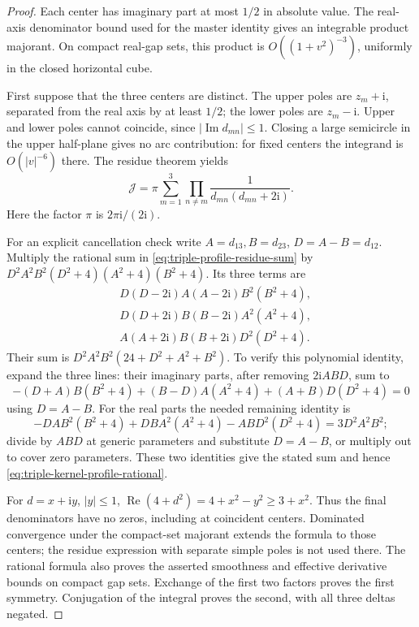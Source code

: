\documentclass[11pt]{article}
\newcommand{\ii}{\mathrm i}
\begin{document}
\begin{proof}
Each center has imaginary part at most \(1/2\) in absolute value.
The real-axis denominator bound used for the master identity gives an
integrable product majorant. On compact real-gap sets, this product is
\(O((1+v^2)^{-3})\), uniformly in the closed horizontal cube.

First suppose that the three centers are distinct. The upper poles
are \(z_m+\ii\), separated from the real axis by at least \(1/2\);
the lower poles are \(z_m-\ii\). Upper and lower poles cannot coincide,
since \(|\operatorname{Im}d_{mn}|\leq1\). Closing a large semicircle
in the upper half-plane gives no arc contribution: for fixed centers
the integrand is \(O(|v|^{-6})\) there. The residue theorem yields
\begin{equation}\label{eq:triple-profile-residue-sum}
 \mathcal J=\pi\sum_{m=1}^3
      \prod_{n\ne m}\frac1{d_{mn}(d_{mn}+2\ii)}.
\end{equation}
Here the factor \(\pi\) is \(2\pi\ii/(2\ii)\).

For an explicit cancellation check write \(A=d_{13},B=d_{23}\),
\(D=A-B=d_{12}\). Multiply the rational sum in
\eqref{eq:triple-profile-residue-sum} by
\(D^2A^2B^2(D^2+4)(A^2+4)(B^2+4)\). Its three terms are
\begin{align*}
 &D(D-2\ii)A(A-2\ii)B^2(B^2+4),\\
 &D(D+2\ii)B(B-2\ii)A^2(A^2+4),\\
 &A(A+2\ii)B(B+2\ii)D^2(D^2+4).
\end{align*}
Their sum is \(D^2A^2B^2(24+D^2+A^2+B^2)\). To verify this
polynomial identity, expand the three lines: their imaginary parts,
after removing \(2\ii ABD\), sum to
\[
 -(D+A)B(B^2+4)+(B-D)A(A^2+4)
                       +(A+B)D(D^2+4)=0
\]
using \(D=A-B\). For the real parts the needed remaining identity is
\[
 -DA B^2(B^2+4)+DB A^2(A^2+4)-AB D^2(D^2+4)
                         =3D^2A^2B^2;
\]
divide by \(ABD\) at generic parameters and substitute \(D=A-B\),
or multiply out to cover zero parameters. These two identities give
the stated sum and hence \eqref{eq:triple-kernel-profile-rational}.

For \(d=x+\ii y\), \(|y|\leq1\),
\(\operatorname{Re}(4+d^2)=4+x^2-y^2\geq3+x^2\).
Thus the final denominators have no zeros, including at coincident
centers. Dominated convergence under the compact-set majorant extends
the formula to those centers; the residue expression with separate
simple poles is not used there. The rational formula also proves the
asserted smoothness and effective derivative bounds on compact gap sets.
Exchange of the first two factors proves the first symmetry. Conjugation
of the integral proves the second, with all three deltas negated.
\end{proof}
\end{document}
